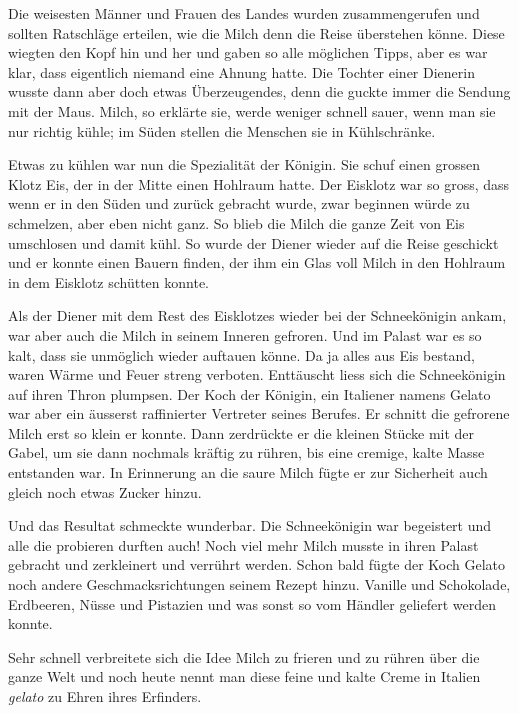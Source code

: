 Die weisesten Männer und Frauen des Landes wurden zusammengerufen und sollten Ratschläge erteilen, wie die Milch denn die Reise überstehen könne. Diese wiegten den Kopf hin und her und gaben so alle möglichen Tipps, aber es war klar, dass eigentlich niemand eine Ahnung hatte. Die Tochter einer Dienerin wusste dann aber doch etwas Überzeugendes, denn die guckte immer die Sendung mit der Maus. Milch, so erklärte sie, werde weniger schnell sauer, wenn man sie nur richtig kühle; im Süden stellen die Menschen sie in Kühlschränke.

Etwas zu kühlen war nun die Spezialität der Königin. Sie schuf einen grossen Klotz Eis, der in der Mitte einen Hohlraum hatte. Der Eisklotz war so gross, dass wenn er in den Süden und zurück gebracht wurde, zwar beginnen würde zu schmelzen, aber eben nicht ganz. So blieb die Milch die ganze Zeit von Eis umschlosen und damit kühl. So wurde der Diener wieder auf die Reise geschickt und er konnte einen Bauern finden, der ihm ein Glas voll Milch in den Hohlraum in dem Eisklotz schütten konnte.

Als der Diener mit dem Rest des Eisklotzes wieder bei der Schneekönigin ankam, war aber auch die Milch in seinem Inneren gefroren. Und im Palast war es so kalt, dass sie unmöglich wieder auftauen könne. Da ja alles aus Eis bestand, waren Wärme und Feuer streng verboten. Enttäuscht liess sich die Schneekönigin auf ihren Thron plumpsen. Der Koch der Königin, ein Italiener namens Gelato war aber ein äusserst raffinierter Vertreter seines Berufes. Er schnitt die gefrorene Milch erst so klein er konnte. Dann zerdrückte er die kleinen Stücke mit der Gabel, um sie dann nochmals kräftig zu rühren, bis eine cremige, kalte Masse entstanden war. In Erinnerung an die saure Milch fügte er zur Sicherheit auch gleich noch etwas Zucker hinzu.

Und das Resultat schmeckte wunderbar. Die Schneekönigin war begeistert und alle die probieren durften auch! Noch viel mehr Milch musste in ihren Palast gebracht und zerkleinert und verrührt werden. Schon bald fügte der Koch Gelato noch andere Geschmacksrichtungen seinem Rezept hinzu. Vanille und Schokolade, Erdbeeren, Nüsse und Pistazien und was sonst so vom Händler geliefert werden konnte.

Sehr schnell verbreitete sich die Idee Milch zu frieren und zu rühren über die ganze Welt und noch heute nennt man diese feine und kalte Creme in Italien {\it gelato} zu Ehren ihres Erfinders.  \hfill {\color{red}\decofourleft}
